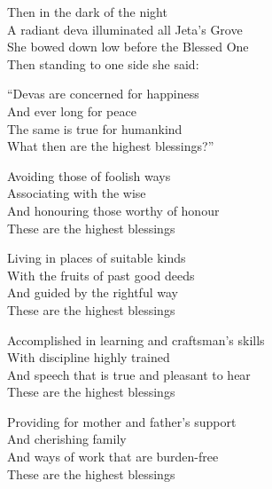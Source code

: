 
\begin{english-only}
  Then in the dark of the night\\
  A radiant deva illuminated all Jeta's Grove\\
  She bowed down low before the Blessed One\\
  Then standing to one side she said:
\end{english-only}

\begin{english-only}
  ``Devas are concerned for happiness\\
  And ever long for peace\\
  The same is true for humankind\\
  What then are the highest blessings?''
\end{english-only}

\begin{english-only}
  Avoiding those of foolish ways\\
  Associating with the wise\\
  And honouring those worthy of honour\\
  These are the highest blessings
\end{english-only}

\begin{english-only}
  Living in places of suitable kinds\\
  With the fruits of past good deeds\\
  And guided by the rightful way\\
  These are the highest blessings
\end{english-only}

\begin{english-only}
  Accomplished in learning and craftsman's skills\\
  With discipline highly trained\\
  And speech that is true and pleasant to hear\\
  These are the highest blessings
\end{english-only}

\begin{english-only}
  Providing for mother and father's support\\
  And cherishing family\\
  And ways of work that are burden-free\ifdigitalversion\makeatletter\hyperlink{endnote155-appendix}\fi\\
  These are the highest blessings
\end{english-only}

